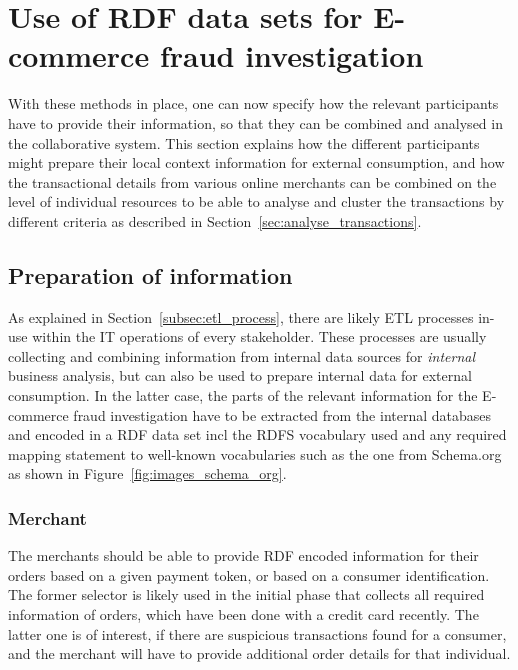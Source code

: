 
\section{Use of \gls{RDF} data sets for \gls{E-commerce} fraud investigation}
\label{sec:working_semantic_data}

With these methods in place, one can now specify how the relevant participants have to provide their information, so that they can be combined and analysed in the collaborative system. This section explains how the different participants might prepare their local context information for external consumption, and how the transactional details from various online merchants can be combined on the level of individual resources to be able to analyse and cluster the transactions by different criteria as described in Section~\ref{sec:analyse_transactions}.

\subsection{Preparation of information}
\label{subsec:prepare_information}

As explained in Section~\ref{subsec:etl_process}, there are likely \gls{ETL} processes in-use within the \gls{IT} operations of every stakeholder. These processes are usually collecting and combining information from internal data sources for \emph{internal} business analysis, but can also be used to prepare internal data for external consumption. In the latter case, the parts of the relevant information for the \gls{E-commerce} fraud investigation have to be extracted from the internal databases and encoded in a \gls{RDF} data set \gls{incl} the \gls{RDFS} vocabulary used and any required mapping statement to well-known vocabularies such as the one from Schema.org as shown in Figure~\ref{fig:images_schema_org}.

\subsubsection{Merchant}
\label{subsub:prep_info_merchant}

The merchants should be able to provide \gls{RDF} encoded information for their orders based on a given payment token, or based on a consumer identification. The former selector is likely used in the initial phase that collects all required information of orders, which have been done with a credit card recently. The latter one is of interest, if there are suspicious transactions found for a consumer, and the merchant will have to provide additional order details for that individual. \\

